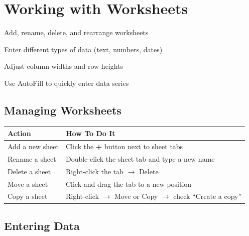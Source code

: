 \chapter{Working with Worksheets}
\label{ch:excel-worksheets}

\begin{objectives}
  \item Add, rename, delete, and rearrange worksheets
  \item Enter different types of data (text, numbers, dates)
  \item Adjust column widths and row heights
  \item Use AutoFill to quickly enter data series
\end{objectives}


\section{Managing Worksheets}
\label{sec:manage-sheets}

\begin{theorybox}
\begin{tabular}{ll}
  \textbf{Action} & \textbf{How To Do It} \\
  \midrule
  Add a new sheet & Click the \textbf{+} button next to sheet tabs \\
  Rename a sheet & Double-click the sheet tab and type a new name \\
  Delete a sheet & Right-click the tab $\rightarrow$ Delete \\
  Move a sheet & Click and drag the tab to a new position \\
  Copy a sheet & Right-click $\rightarrow$ Move or Copy $\rightarrow$ check ``Create a copy'' \\
\end{tabular}
\end{theorybox}

\section{Entering Data}
\label{sec:entering-data}

